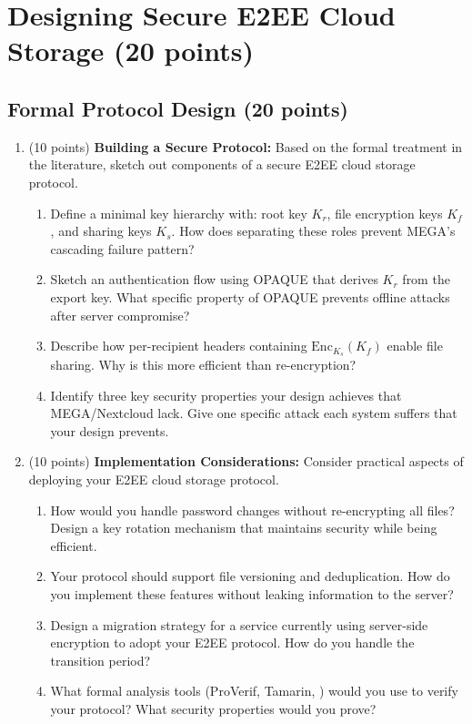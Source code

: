 \documentclass[10pt,a4paper,american]{exam}
\begin{document}
\section{Designing Secure E2EE Cloud Storage (20 points)}

\subsection{Formal Protocol Design (20 points)}

\begin{enumerate}
	\item (10 points) \textbf{Building a Secure Protocol:}
	      Based on the formal treatment in the literature, sketch out components of a secure E2EE cloud storage protocol.
	      \begin{enumerate}
		      \item Define a minimal key hierarchy with: root key $K_r$, file encryption keys $K_f$, and sharing keys $K_s$. How does separating these roles prevent MEGA's cascading failure pattern?
		      \item Sketch an authentication flow using OPAQUE that derives $K_r$ from the export key. What specific property of OPAQUE prevents offline attacks after server compromise?
		      \item Describe how per-recipient headers containing $\text{Enc}_{K_s}(K_f)$ enable file sharing. Why is this more efficient than re-encryption?
		      \item Identify three key security properties your design achieves that MEGA/Nextcloud lack. Give one specific attack each system suffers that your design prevents.
	      \end{enumerate}
	\item (10 points) \textbf{Implementation Considerations:}
	      Consider practical aspects of deploying your E2EE cloud storage protocol.
	      \begin{enumerate}
		      \item How would you handle password changes without re-encrypting all files? Design a key rotation mechanism that maintains security while being efficient.
		      \item Your protocol should support file versioning and deduplication. How do you implement these features without leaking information to the server?
		      \item Design a migration strategy for a service currently using server-side encryption to adopt your E2EE protocol. How do you handle the transition period?
		      \item What formal analysis tools (ProVerif, Tamarin, \fstar) would you use to verify your protocol? What security properties would you prove?
	      \end{enumerate}
\end{enumerate}
\end{document}
